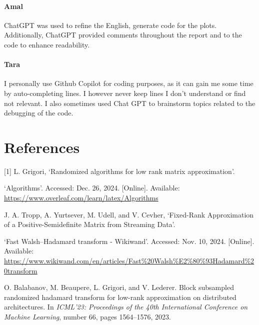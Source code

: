 \documentclass[a4paper, 12pt,oneside]{article}
\begin{document}
		\paragraph{Amal}
		ChatGPT was used to refine the English, generate code for the plots. Additionally, ChatGPT provided comments throughout the report and to the code to enhance readability.
		\paragraph{Tara}
		I personally use Github Copilot for coding purposes, as it can gain me some time by auto-completing lines. I however never keep lines I don't understand or find not relevant. I also sometimes used Chat GPT to brainstorm topics related to the debugging of the code.	
	\section*{References}
	[1] L. Grigori, ‘Randomized algorithms for low rank matrix approximation’.

	\noindent
	[2] ‘Algorithms’. Accessed: Dec. 26, 2024. [Online]. Available: \url{https://www.overleaf.com/learn/latex/Algorithms}

	\noindent
	[3] J. A. Tropp, A. Yurtsever, M. Udell, and V. Cevher, ‘Fixed-Rank Approximation of a Positive-Semidefinite Matrix from Streaming Data’.

	\noindent
	[4] ‘Fast Walsh–Hadamard transform - Wikiwand’. Accessed: Nov. 10, 2024. [Online]. Available: \url{https://www.wikiwand.com/en/articles/Fast%20Walsh%E2%80%93Hadamard%20transform}
	
	\noindent
	[5] O. Balabanov, M. Beaupere, L. Grigori, and V. Lederer. Block subsampled randomized hadamard transform for low-rank approximation on distributed architectures. In \emph{ICML'23: Proceedings of the 40th International Conference on Machine Learning}, number 66, pages 1564--1576, 2023.
\end{document}
